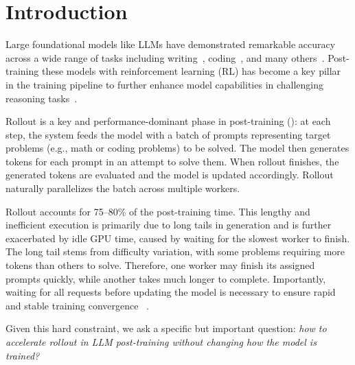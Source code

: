 \section{Introduction}
\label{sec:intro}


\noindent
Large foundational models like LLMs have demonstrated remarkable
accuracy across a wide range of tasks including
writing~\cite{DBLP:journals/corr/abs-2303-08774}, coding~\cite{DBLP:journals/corr/abs-2308-12950}, 
and many others~\cite{DBLP:journals/corr/abs-2112-09332,perf-agent,DBLP:journals/corr/abs-2504-05738,DBLP:journals/corr/abs-2502-01450}. 
Post-training these models with reinforcement learning (RL)
has become a key pillar in the training pipeline
to further enhance model capabilities 
in challenging reasoning tasks~\cite{DBLP:journals/corr/abs-2501-12948}.

Rollout is a key and performance-dominant phase in post-training (\textsection{\ref{sec:bg-motivation}}):
at each step,
the system feeds the model with a batch of prompts representing
target problems (e.g., math or coding problems) to be solved.
The model then generates tokens for each prompt in an attempt
to solve them.
When rollout finishes, the generated tokens are evaluated
and the model is updated accordingly.
Rollout naturally parallelizes the batch across multiple workers. 


Rollout accounts for {75--80}\% of the post-training time.
This lengthy and inefficient execution is primarily due to 
long tails in generation and is further exacerbated by idle GPU time, 
caused by waiting for the slowest worker to finish.
The long tail stems from difficulty variation, with some problems requiring more tokens than others to solve.
Therefore, one worker may finish its assigned prompts quickly,
while another takes much longer to complete.
Importantly, waiting for all requests before updating the model
is necessary to ensure rapid and stable training convergence 
~\cite{DBLP:journals/corr/SchulmanWDRK17,DBLP:journals/corr/abs-2402-03300,dapo}. 

Given this hard constraint, we ask a specific but important question:
\emph{how to accelerate rollout in LLM post-training {without changing
how the model is trained}?}


